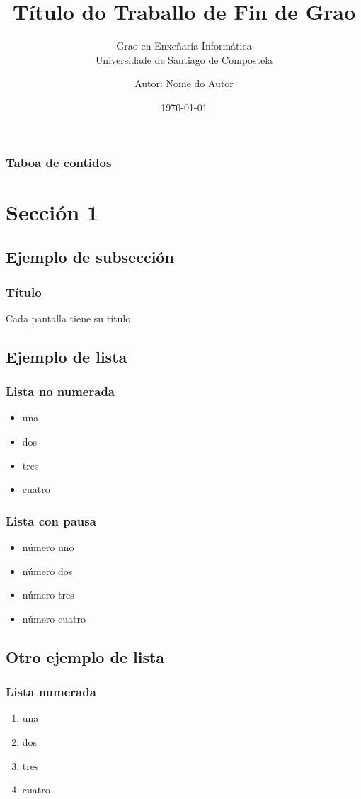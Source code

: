 \documentclass{beamer}
\begin{document}
\title{Título do Traballo de Fin de Grao}
\subtitle{Grao en Enxeñaría Informática \\
Universidade de Santiago de Compostela}  
\author{Autor: Nome do Autor}
\date{\today} 

\begin{frame}
\titlepage
\end{frame}

\begin{frame}
\frametitle{Taboa de contidos}\tableofcontents
\end{frame} 

\section{Sección 1} 
\subsection{Ejemplo de subsección}
\begin{frame}
\frametitle{Título} 
Cada pantalla tiene su título.
\end{frame}

\subsection{Ejemplo de lista}

\begin{frame}
\frametitle{Lista no numerada}
\begin{itemize}
\item una  
\item dos 
\item tres 
\item cuatro
\end{itemize} 
\end{frame}

\begin{frame}
\frametitle{Lista con pausa}
\begin{itemize}
\item número uno \pause 
\item número dos \pause 
\item número tres \pause 
\item número cuatro
\end{itemize} 
\end{frame}

\subsection{Otro ejemplo de lista}
\begin{frame}
\frametitle{Lista numerada}
\begin{enumerate}
\item una  
\item dos 
\item tres 
\item cuatro
\end{enumerate}
\end{frame}
\end{document}
